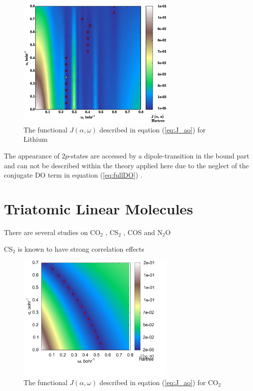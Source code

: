 \begin{figure}
\includegraphics[width=0.69\textwidth]{Figures/Lithium/Lithium_J0_2D_terrain_path_spline_cut}
\caption{The functional $J(\alpha,\omega)$ described in eqation (\ref{eq:J_ao}) for Lithium}
\label{fig:Lith-otrsh}
\end{figure}

The appearance of $2p$-states are accessed by a dipole-transition in the bound part and can not be described within the theory applied here due to the neglect of the conjugate DO term in equation (\ref{eq:fullDO}) \cite{saPonzi}.

\section{Triatomic Linear Molecules}
There are several studies on CO$_2$ \cite{CO2, CO2_highres, HighResLinear, DiffLinear}, CS$_2$ \cite{DiffLinear,HighResLinear}, COS \cite{DiffLinear,HighResLinear} and N$_2$O \cite{DiffLinear}

CS$_2$ is known to have strong correlation effects \cite{2phcederbaum}
\begin{figure}
\includegraphics[width=0.69\textwidth]{Figures/CO2_J0_2D_terrain}
\caption{The functional $J(\alpha,\omega)$ described in eqation (\ref{eq:J_ao}) for CO$_2$}
\label{fig:CO2-otrsh}
\end{figure}

